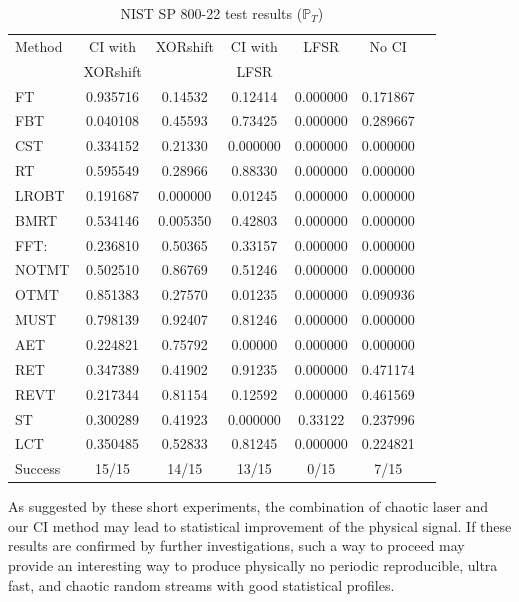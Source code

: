 \begin{table}[!t]
  \renewcommand{\arraystretch}{1.3}
  \caption{NIST SP 800-22 test results ($\mathbb{P}_T$)}
  \label{nist ci chaotic laser}
  \centering
  \begin{tabular}{|l|c|c|c|c|c|c|}
    \hline
    Method & CI with  & XORshift &  CI with & LFSR & No CI  \\ 
           & XORshift &          &  LFSR   &       &         \\\hline\hline
    FT 	&  0.935716 &  0.14532 & 0.12414&  0.000000&  0.171867  \\ \hline
    FBT 	 & 0.040108 & 0.45593 & 0.73425& 0.000000&  0.289667 \\ \hline
    CST 	&  0.334152 & 0.21330 &  0.000000& 0.000000&  0.000000 \\ \hline
    RT 	&  0.595549 &  0.28966 & 0.88330&  0.000000&  0.000000 \\ \hline
    LROBT 	 & 0.191687 &  0.000000 & 0.01245& 0.000000&  0.000000 \\ \hline
    BMRT 	 & 0.534146 &  0.005350 & 0.42803&  0.000000&  0.000000 \\ \hline
    FFT: 	 & 0.236810 &  0.50365 &0.33157 &  0.000000&  0.000000 \\ \hline
    NOTMT	&  0.502510 &  0.86769 &0.51246 &  0.000000&  0.000000 \\ \hline
    OTMT 	&  0.851383 &  0.27570 &0.01235 &  0.000000&  0.090936 \\ \hline
    MUST 	  &0.798139 &  0.92407 & 0.81246& 0.000000&  0.000000 \\ \hline
    AET &	  0.224821 &  0.75792 &0.00000 & 0.000000&  0.000000 \\ \hline
    RET 	&  0.347389 &  0.41902& 0.91235 &  0.000000&  0.471174 \\ \hline
    REVT &	  0.217344 &  0.81154 &0.12592 &  0.000000&  0.461569 \\ \hline
    ST	 & 0.300289 &  0.41923 &  0.000000& 0.33122 & 0.237996\\ \hline
    LCT &	  0.350485 &  0.52833 &0.81245&  0.000000&  0.224821\\ \hline
Success 			&15/15		&14/15 &13/15	 &0/15		&7/15 \\ \hline
  \end{tabular}
\end{table}



As suggested by these short experiments, the combination of chaotic laser and our CI method 
may lead to statistical improvement of the physical signal. 
If these results are confirmed by further investigations, such a way 
to proceed may provide an interesting way to produce physically no periodic
reproducible, ultra fast, and chaotic random streams with good statistical profiles.

 
